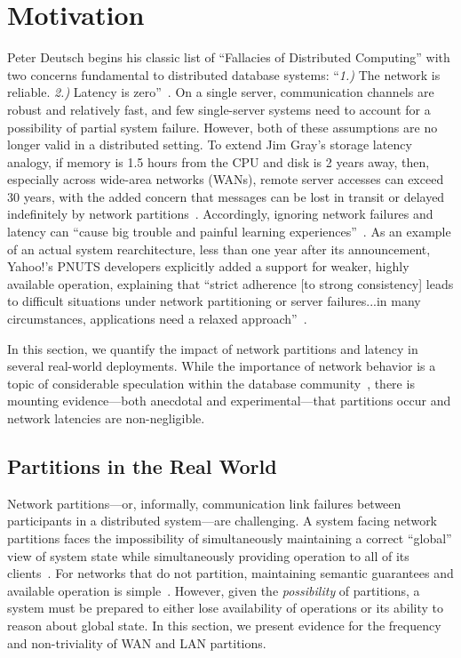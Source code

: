 
\section{Motivation}
\label{sec:motivation}

Peter Deutsch begins his classic list of ``Fallacies of Distributed
Computing'' with two concerns fundamental to distributed database
systems: ``\textit{1.)}  The network is reliable. \textit{2.)} Latency
is zero''~\cite{fallacies-deutsch}. On a single server, communication
channels are robust and relatively fast, and few single-server systems
need to account for a possibility of partial system failure. However,
both of these assumptions are no longer valid in a distributed
setting. To extend Jim Gray's storage latency analogy, if memory is
1.5 hours from the CPU and disk is 2 years away, then, especially
across wide-area networks (WANs), remote server accesses can exceed 30
years, with the added concern that messages can be lost in transit or
delayed indefinitely by network
partitions~\cite{gray-rules}. Accordingly, ignoring network failures
and latency can ``cause big trouble and painful learning
experiences''~\cite{fallacies-deutsch}. As an example of an actual system rearchitecture,
less than one year after its announcement, Yahoo!'s PNUTS developers
explicitly added a support for weaker, highly available operation,
explaining that ``strict adherence [to strong consistency] leads to
difficult situations under network partitioning or server
failures...in many circumstances, applications need a relaxed
approach''~\cite{pnuts-update}.

In this section, we quantify the impact of network partitions and
latency in several real-world deployments. While the importance of
network behavior is a topic of considerable speculation within the
database community~\cite{stonebraker2010errors}, there is mounting
evidence---both anecdotal and experimental---that partitions occur and
network latencies are non-negligible.

\subsection{Partitions in the Real World}

Network partitions---or, informally, communication link failures
between participants in a distributed system---are challenging. A
system facing network partitions faces the impossibility of
simultaneously maintaining a correct ``global'' view of system state
while simultaneously providing operation to all of its
clients~\cite{davidson-survey}. For networks that do not partition,
maintaining semantic guarantees and available operation is
simple~\cite{stonebraker2010errors}. However, given the
\textit{possibility} of partitions, a system must be prepared to
either lose availability of operations or its ability to reason about
global state. In this section, we present evidence for the frequency
and non-triviality of WAN and LAN partitions.

